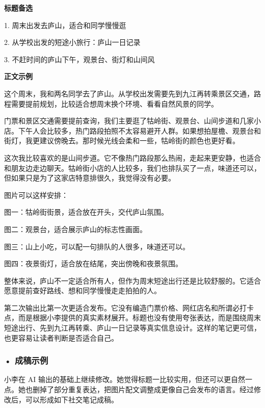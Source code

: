 \begin{aibox}
\textbf{标题备选}

1. 周末出发去庐山，适合和同学慢慢逛

2. 从学校出发的短途小旅行：庐山一日记录

3. 不赶时间的庐山下午，观景台、街灯和山间风

\textbf{正文示例}

这个周末，我和两名同学去了庐山。从学校出发需要先到九江再转乘景区交通，路程需要提前规划，比较适合想周末换个环境、看看自然风景的同学。

门票和景区交通需要提前查询，我们主要逛了牯岭街、观景台、山间步道和几家小店。下午人会比较多，热门路段拍照不太容易避开人群。如果想拍屋檐、观景台和街灯，我更建议傍晚去。那时候光线会柔和一些，牯岭街的颜色也更好看。

这次我比较喜欢的是山间步道。它不像热门路段那么热闹，走起来更安静，也适合和朋友边走边聊天。牯岭街小店的人比较多，我们也排队买了一点，味道还可以，但如果只是为了这家店特意排很久，我觉得没有必要。

图片可以这样安排：

图一：牯岭街街景，适合放在开头，交代庐山氛围。

图二：观景台，适合展示庐山的标志性画面。

图三：山上小吃，可以配一句排队的人很多，味道还可以。

图四：夜景街灯，适合放在结尾，突出傍晚和夜景氛围。

整体来说，庐山不一定适合所有人，但作为周末短途出行还是比较舒服的。它适合愿意提前查好路线、想和同学慢慢走走拍拍的人。
\end{aibox}

第二次输出比第一次更适合发布。它没有编造门票价格、网红店名和所谓必打卡点，而是根据小李提供的真实素材展开。标题也没有使用夸张表达，而是围绕周末短途出行、先到九江再转乘、庐山一日记录等真实信息设计。这样的笔记更可信，也更容易让读者判断是否适合自己。

\subsubsection*{\textbf{• 成稿示例}}

小李在 AI 输出的基础上继续修改。她觉得标题一比较实用，但还可以更自然一点。她也删掉了部分重复表达，把图片配文调整成更像自己会发布的语言。经过修改后，可以形成如下社交笔记成稿。


